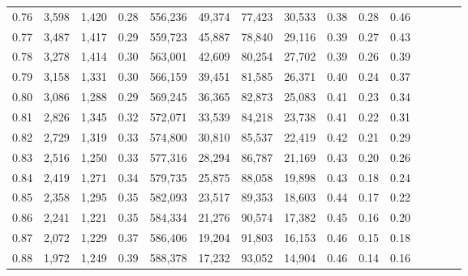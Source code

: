 \begin{tabular}{rrrcrrrrrrrrrrr}
0.76 &   3,598 &  1,420 &                                       0.28 &  556,236 &   49,374 &   77,423 &   30,533 &  0.38 &  0.28 &                         0.46 \\
0.77 &   3,487 &  1,417 &                                       0.29 &  559,723 &   45,887 &   78,840 &   29,116 &  0.39 &  0.27 &                         0.43 \\
0.78 &   3,278 &  1,414 &                                       0.30 &  563,001 &   42,609 &   80,254 &   27,702 &  0.39 &  0.26 &                         0.39 \\
0.79 &   3,158 &  1,331 &                                       0.30 &  566,159 &   39,451 &   81,585 &   26,371 &  0.40 &  0.24 &                         0.37 \\
0.80 &   3,086 &  1,288 &                                       0.29 &  569,245 &   36,365 &   82,873 &   25,083 &  0.41 &  0.23 &                         0.34 \\
0.81 &   2,826 &  1,345 &                                       0.32 &  572,071 &   33,539 &   84,218 &   23,738 &  0.41 &  0.22 &                         0.31 \\
0.82 &   2,729 &  1,319 &                                       0.33 &  574,800 &   30,810 &   85,537 &   22,419 &  0.42 &  0.21 &                         0.29 \\
0.83 &   2,516 &  1,250 &                                       0.33 &  577,316 &   28,294 &   86,787 &   21,169 &  0.43 &  0.20 &                         0.26 \\
0.84 &   2,419 &  1,271 &                                       0.34 &  579,735 &   25,875 &   88,058 &   19,898 &  0.43 &  0.18 &                         0.24 \\
0.85 &   2,358 &  1,295 &                                       0.35 &  582,093 &   23,517 &   89,353 &   18,603 &  0.44 &  0.17 &                         0.22 \\
0.86 &   2,241 &  1,221 &                                       0.35 &  584,334 &   21,276 &   90,574 &   17,382 &  0.45 &  0.16 &                         0.20 \\
0.87 &   2,072 &  1,229 &                                       0.37 &  586,406 &   19,204 &   91,803 &   16,153 &  0.46 &  0.15 &                         0.18 \\
0.88 &   1,972 &  1,249 &                                       0.39 &  588,378 &   17,232 &   93,052 &   14,904 &  0.46 &  0.14 &                         0.16 \\

\end{tabular}
